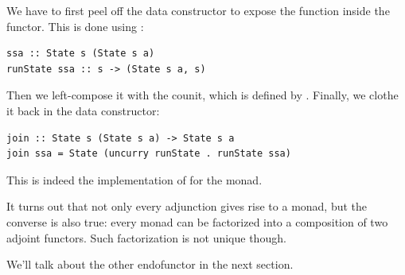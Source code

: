 We have to first peel off the data constructor  to expose
the function inside the  functor. This is done using
:

\begin{Verbatim}[commandchars=\\\{\}]
ssa :: State s (State s a)
runState ssa :: s -> (State s a, s)
\end{Verbatim}
Then we left-compose it with the counit, which is defined by
. Finally, we clothe it back in the
 data constructor:

\begin{Verbatim}[commandchars=\\\{\}]
join :: State s (State s a) -> State s a
join ssa = State (uncurry runState . runState ssa)
\end{Verbatim}
This is indeed the implementation of  for the
 monad.

It turns out that not only every adjunction gives rise to a monad, but
the converse is also true: every monad can be factorized into a
composition of two adjoint functors. Such factorization is not unique
though.

We'll talk about the other endofunctor  in the next
section.